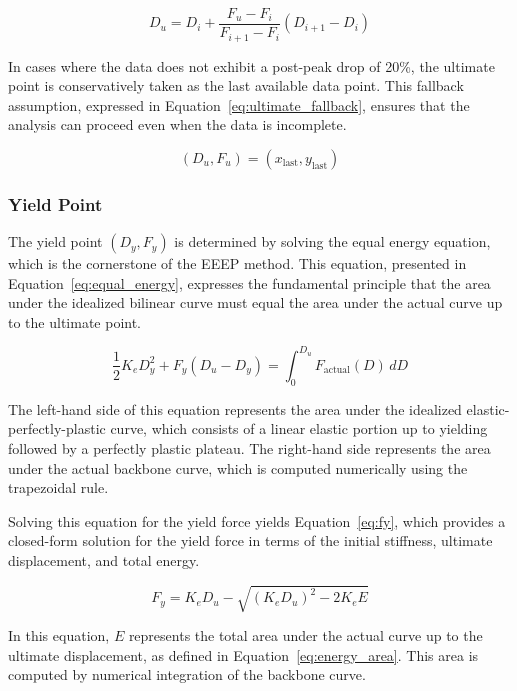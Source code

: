\documentclass[11pt,a4paper]{article}
\begin{document}
\begin{equation}
D_u = D_i + \frac{F_u - F_i}{F_{i+1} - F_i} (D_{i+1} - D_i)
\label{eq:du_interp}
\end{equation}

In cases where the data does not exhibit a post-peak drop of 20\%, the ultimate point is conservatively taken as the last available data point. This fallback assumption, expressed in Equation~\ref{eq:ultimate_fallback}, ensures that the analysis can proceed even when the data is incomplete.

\begin{equation}
(D_u, F_u) = (x_{\text{last}}, y_{\text{last}})
\label{eq:ultimate_fallback}
\end{equation}

\subsubsection{Yield Point}

The yield point \((D_y, F_y)\) is determined by solving the equal energy equation, which is the cornerstone of the EEEP method. This equation, presented in Equation~\ref{eq:equal_energy}, expresses the fundamental principle that the area under the idealized bilinear curve must equal the area under the actual curve up to the ultimate point.

\begin{equation}
\frac{1}{2} K_e D_y^2 + F_y (D_u - D_y) = \int_0^{D_u} F_{\text{actual}}(D) \, dD
\label{eq:equal_energy}
\end{equation}

The left-hand side of this equation represents the area under the idealized elastic-perfectly-plastic curve, which consists of a linear elastic portion up to yielding followed by a perfectly plastic plateau. The right-hand side represents the area under the actual backbone curve, which is computed numerically using the trapezoidal rule.

Solving this equation for the yield force yields Equation~\ref{eq:fy}, which provides a closed-form solution for the yield force in terms of the initial stiffness, ultimate displacement, and total energy.

\begin{equation}
F_y = K_e D_u - \sqrt{(K_e D_u)^2 - 2 K_e E}
\label{eq:fy}
\end{equation}

In this equation, \(E\) represents the total area under the actual curve up to the ultimate displacement, as defined in Equation~\ref{eq:energy_area}. This area is computed by numerical integration of the backbone curve.
\end{document}
